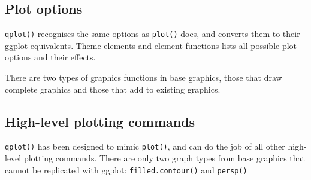 \subsection{Plot options}

\texttt{qplot()} recognises the same options as \texttt{plot()} does,
and converts them to their ggplot equivalents.
\hyperref[sec:themeux5felements]{Theme elements and element functions}
lists all possible plot options and their effects.

\begin{Shaded}
\begin{Highlighting}[]
 \NormalTok{, } \NormalTok{)}
\StringTok{ }\NormalTok{() +}\StringTok{ }
\StringTok{  }\NormalTok{(}\NormalTok{) +}\StringTok{ }\NormalTok{()}
\end{Highlighting}
\end{Shaded}


There are two types of graphics functions in base graphics, those that
draw complete graphics and those that add to existing graphics.

\subsection{High-level plotting commands}

\texttt{qplot()} has been designed to mimic \texttt{plot()}, and can do
the job of all other high-level plotting commands. There are only two
graph types from base graphics that cannot be replicated with ggplot:
\texttt{filled.contour()} and \texttt{persp()}

